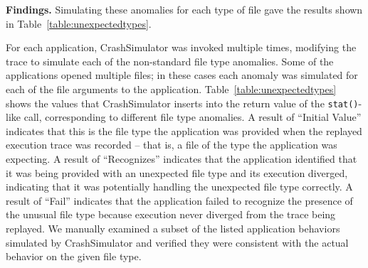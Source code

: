 {\bf Findings.}
Simulating these anomalies for each type of file
gave the results shown in Table~\ref{table:unexpectedtypes}.

For each application, CrashSimulator was invoked multiple times, modifying
the trace to simulate each of the non-standard file type anomalies.  Some
of the applications opened multiple files; in these cases each anomaly was
simulated for each of the file arguments to the application.
Table~\ref{table:unexpectedtypes} shows the values that CrashSimulator
inserts into the return value of the {\tt stat()}-like call, corresponding
to different file type anomalies.  A result of ``Initial Value'' indicates
that this is the file type the application was provided when the replayed
execution trace was recorded -- that is, a file of the type the application
was expecting.  A result of ``Recognizes'' indicates that the application
identified that it was being provided with an unexpected file type and its
execution diverged, indicating that it was potentially handling the
unexpected file type correctly.  A result of ``Fail'' indicates that the
application failed to recognize the presence of the unusual file type
because execution never diverged from the trace being replayed.  We
manually examined a subset of the listed application behaviors simulated by
CrashSimulator and verified they were consistent with the actual behavior
on the given file type.

